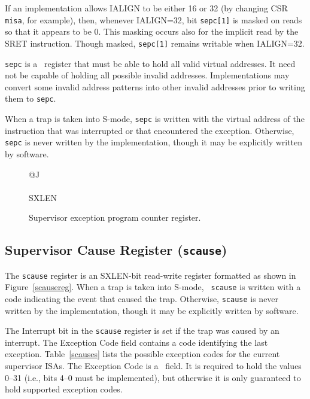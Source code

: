 If an implementation allows IALIGN to be either 16 or 32 (by
changing CSR {\tt misa}, for example), then, whenever IALIGN=32, bit
{\tt sepc[1]} is masked on reads so that it appears to be 0.  This
masking occurs also for the implicit read by the SRET instruction.
Though masked, {\tt sepc[1]} remains writable when IALIGN=32.

{\tt sepc} is a \warl\ register that must be able to hold all valid
virtual addresses.  It need not be capable of holding all possible invalid
addresses.  Implementations may convert some invalid address patterns into
other invalid addresses prior to writing them to {\tt sepc}.

When a trap is taken into S-mode, {\tt sepc} is written with the
virtual address of the instruction that was interrupted or that
encountered the exception.  Otherwise, {\tt sepc} is never written by
the implementation, though it may be explicitly written by software.

\begin{figure}[h!]
{\footnotesize
\begin{center}
\begin{tabular}{@{}J}
 \\
\hline
{} \\
\hline
SXLEN \\
\end{tabular}
\end{center}
}
\vspace{-0.1in}
\caption{Supervisor exception program counter register.}
\label{epcreg}
\end{figure}

\subsection{Supervisor Cause Register ({\tt scause})}
\label{sec:scause}

The {\tt scause} register is an SXLEN-bit read-write register formatted as
shown in Figure~\ref{scausereg}.  When a trap is taken into S-mode, {\tt
scause} is written with a code indicating the event that caused the trap.
Otherwise, {\tt scause} is never written by the implementation, though it may be
explicitly written by software.

The Interrupt bit in the {\tt scause} register is set if the
trap was caused by an interrupt. The Exception Code field
contains a code identifying the last exception.  Table~\ref{scauses}
lists the possible exception codes for the current supervisor ISAs.
The Exception Code is a \wlrl\ field.  It is required to hold
the values 0--31 (i.e., bits 4--0 must be implemented), but otherwise
it is only guaranteed to hold supported exception codes.


